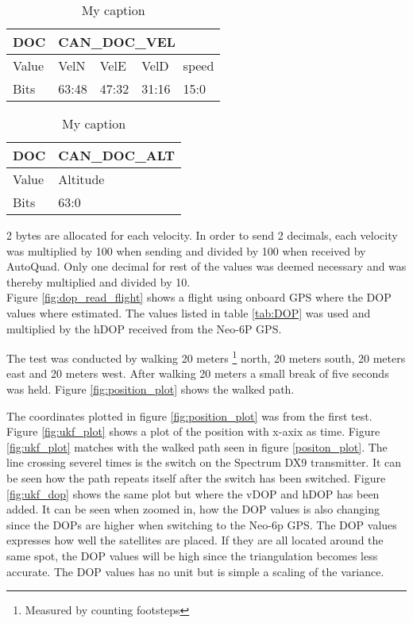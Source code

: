 \begin{table}[]
\centering
\caption{My caption}
\label{my-label}
\begin{tabular}{@{}|l|l|l|l|l|@{}}
\toprule
DOC   & \multicolumn{4}{l|}{CAN\_DOC\_VEL} \\ \midrule
Value & VelN    & VelE   & VelD   & speed  \\ \midrule
Bits  & 63:48   & 47:32  & 31:16  & 15:0   \\ \bottomrule
\end{tabular}
\end{table}

\begin{table}[]
\centering
\caption{My caption}
\label{my-label}
\begin{tabular}{@{}|l|l|@{}}
\toprule
DOC   & CAN\_DOC\_ALT \\ \midrule
Value & Altitude      \\ \midrule
Bits  & 63:0          \\ \bottomrule
\end{tabular}
\end{table}
2 bytes are allocated for each velocity. In order to send 2 decimals, each velocity was multiplied by 100 when sending and divided by 100 when received by AutoQuad.
Only one decimal for rest of the values was deemed necessary and was thereby multiplied and divided by 10. \\

Figure \ref{fig:dop_read_flight} shows a flight using onboard GPS where the DOP values where estimated. The values listed in table \ref{tab:DOP} was used and multiplied by the hDOP received from the Neo-6P GPS. 


The test was conducted by walking 20 meters \footnote{Measured by counting footsteps} north, 20 meters south, 20 meters east and 20 meters west. After walking 20 meters a small break of five seconds was held. Figure \ref{fig:position_plot} shows the walked path.

The coordinates plotted in figure \ref{fig:position_plot} was from the first test. Figure \ref{fig:ukf_plot} shows a plot of the position with x-axix as time.
Figure \ref{fig:ukf_plot} matches with the walked path seen in figure \ref{positon_plot}. The line crossing severel times is the switch on the Spectrum DX9 transmitter. It can be seen how the path repeats itself after the switch has been switched.
Figure \ref{fig:ukf_dop} shows the same plot but where the vDOP and hDOP has been added. It can be seen when zoomed in, how the DOP values is also changing since the DOPs are higher when switching to the Neo-6p GPS. The DOP values expresses how well the satellites are placed. If they are all located around the same spot, the DOP values will be high since the triangulation becomes less accurate. The DOP values has no unit but is simple a scaling of the variance. \cite{gpsbog}


